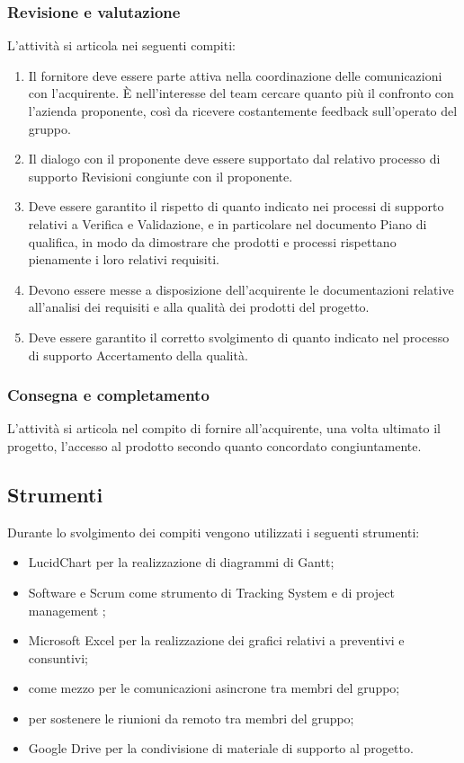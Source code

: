 \subsubsection{Revisione e valutazione}
L'attività si articola nei seguenti compiti:
\begin{enumerate}
    \item Il fornitore deve essere parte attiva nella coordinazione delle comunicazioni con l'acquirente. È nell'interesse del team cercare quanto più il confronto con l'azienda proponente, così da ricevere costantemente feedback sull'operato del gruppo.
    \item Il dialogo con il proponente deve essere supportato dal relativo processo di supporto Revisioni congiunte con il proponente.
    \item Deve essere garantito il rispetto di quanto indicato nei processi di supporto relativi a Verifica e Validazione, e in particolare nel documento Piano di qualifica, in modo da dimostrare che prodotti e processi rispettano pienamente i loro relativi requisiti.
    \item Devono essere messe a disposizione dell'acquirente le documentazioni relative all'analisi dei requisiti e alla qualità dei prodotti del progetto.
    \item Deve essere garantito il corretto svolgimento di quanto indicato nel processo di supporto Accertamento della qualità.
\end{enumerate}

\subsubsection{Consegna e completamento}
L'attività si articola nel compito di fornire all'acquirente, una volta ultimato il progetto, l'accesso al prodotto secondo quanto concordato congiuntamente.


\subsection{Strumenti}
Durante lo svolgimento dei compiti vengono utilizzati i seguenti strumenti:
\begin{itemize}
    \item LucidChart per la realizzazione di diagrammi di Gantt;
    \item {} Software e Scrum come strumento di  Tracking System e di project management ; 
    \item Microsoft Excel per la realizzazione dei grafici relativi a preventivi e consuntivi;
    \item {} come mezzo per le comunicazioni asincrone tra membri del gruppo;
    \item {} per sostenere le riunioni da remoto tra membri del gruppo;
    \item Google Drive per la condivisione di materiale di supporto al progetto.
\end{itemize}

